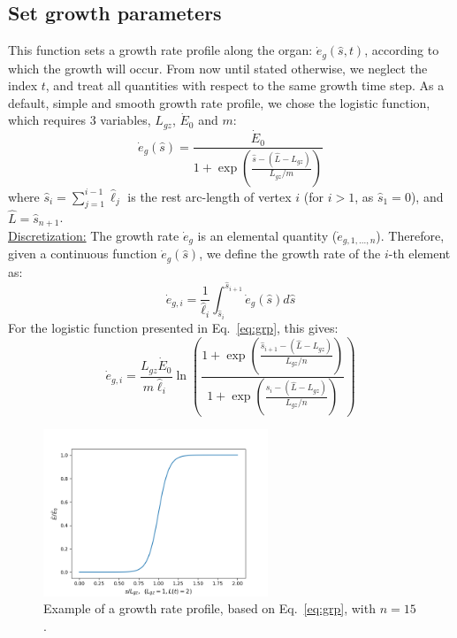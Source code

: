 \documentclass[a4paper, 11pt]{article}
\begin{document}
\subsection*{Set growth parameters}
This function sets a growth rate profile along the organ: $\dot{e}_g(\hat{s},t)$, according to which the growth will occur. From now until stated otherwise, we neglect the index $t$, and treat all quantities with respect to the same growth time step. As a default, simple and smooth growth rate profile, we chose the logistic function, which requires 3 variables, $L_{gz}$, $\dot{E}_0$ and $m$:
\begin{equation}\label{eq:grp}
    \dot{e}_g(\hat{s})=\frac{\dot{E}_0}{1+\exp{\left(\frac{\hat{s}-(\hat{L}-L_{gz})}{L_{gz}/m}\right)}}
\end{equation}
where $\hat{s}_i=\sum_{j=1}^{i-1}\hat{\ell}_j$ is the rest arc-length of vertex $i$ (for $i>1$, as $\hat{s}_1=0$), and $\hat{L}=\hat{s}_{n+1}$.\\

\noindent \underline{Discretization:} The growth rate $\dot{e}_g$ is an elemental quantity ($\dot{e}_{g,1,...,n}$). Therefore, given a continuous function $\dot{e}_g(\hat{s})$, we define the growth rate of the $i$-th element as:
\begin{equation}
    \dot{e}_{g,i}=\frac{1}{\hat{\ell}_i}\int_{\hat{s}_i}^{\hat{s}_{i+1}}\dot{e}_g(\hat{s})d\hat{s}
\end{equation}
For the logistic function presented in Eq.~\ref{eq:grp}, this gives:
\begin{equation}
    \dot{e}_{g,i}=\frac{L_{gz}\dot{E}_0}{m\hat{\ell}_i}\ln{\left(\frac{1+\exp{\left(\frac{\hat{s}_{i+1}-(\hat{L}-L_{gz})}{L_{gz}/n}\right)}}{1+\exp{\left(\frac{\hat{s}_i-(\hat{L}-L_{gz})}{L_{gz}/n}\right)}}\right)}
\end{equation}
\begin{figure}[h!]
    \centering
    \includegraphics[width=0.60\textwidth]{growth_rate.png}
    \caption{Example of a growth rate profile, based on Eq.~\ref{eq:grp}, with $n=15$.}
\end{figure}
\end{document}
